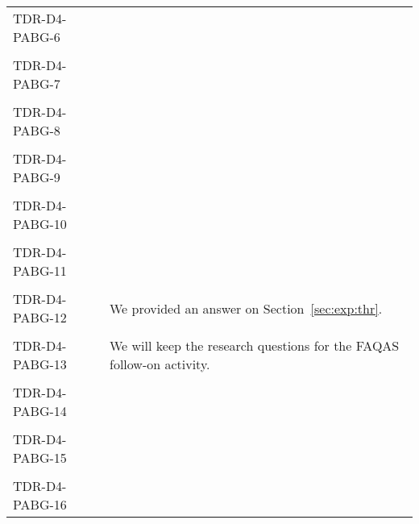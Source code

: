 \begin{longtable}{|p{2cm}|p{12cm}|@{}}
\\
\hline  
TDR-D4-PABG-6&
\begin{minipage}{12cm}
\end{minipage}\\
\\
\hline  
TDR-D4-PABG-7&
\begin{minipage}{12cm}
\end{minipage}\\
\\
\hline  
TDR-D4-PABG-8&
\begin{minipage}{12cm}
\end{minipage}\\
\\
\hline  
TDR-D4-PABG-9&
\begin{minipage}{12cm}
\end{minipage}\\
\\
\hline  
TDR-D4-PABG-10&
\begin{minipage}{12cm}
\end{minipage}\\
\\
\hline  
TDR-D4-PABG-11&
\begin{minipage}{12cm}
\end{minipage}\\
\\
\hline  
TDR-D4-PABG-12&
\begin{minipage}{12cm}
We provided an answer on Section~\ref{sec:exp:thr}.
\end{minipage}\\
\\
\hline  
TDR-D4-PABG-13&
\begin{minipage}{12cm}
We will keep the research questions for the FAQAS follow-on activity.
\end{minipage}\\
\\
\hline  
TDR-D4-PABG-14&
\begin{minipage}{12cm}
\end{minipage}\\
\\
\hline  
TDR-D4-PABG-15&
\begin{minipage}{12cm}
\end{minipage}\\
\\
\hline  
TDR-D4-PABG-16&
\begin{minipage}{12cm}
\end{minipage}\\

\end{longtable}
